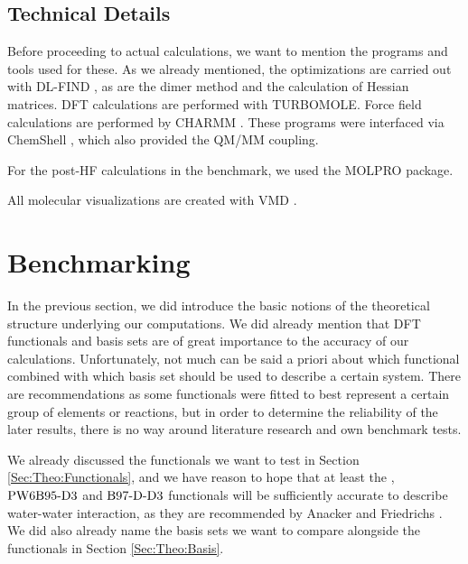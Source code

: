\documentclass[8.5pt,twoside,twocolumn]{article}
\theoremstyle{standard}
\begin{document}
\subsection{Technical Details}

Before proceeding to actual calculations, we want to mention the programs and tools 
used for these. As we already mentioned, the optimizations are carried out with
DL-FIND \cite{Kaestner2009}, as are the dimer method and the calculation of 
Hessian matrices. DFT calculations are performed with TURBOMOLE\cite{TURBOMOLE}.
Force field calculations are performed by CHARMM \cite{CHARMM2009}. These programs were interfaced
via ChemShell \cite{chemshell}, which also provided the QM/MM coupling.

For the post-HF calculations in the benchmark, we used the MOLPRO \cite{MOLPRO_brief}
package.

All molecular visualizations are created with VMD \cite{HUMP96}.



\section{Benchmarking}
\newcommand\htohto{\enmat{\hto-\hto}}
\newcommand\htoh{\enmat{\hto-\te H}}
\label{Sec:Bench}

In the previous section, we did introduce the basic notions of the theoretical structure underlying our
computations. We did already mention that DFT functionals and basis sets are of great importance
to the accuracy of our calculations. Unfortunately, not much can be said a priori about
which functional combined with which basis set should be used to describe a certain system.
There are recommendations as some functionals were fitted to best represent a certain
group of elements or reactions, but in order to determine the reliability of the
later results, there is no way around literature research and own benchmark tests.

We already
discussed the functionals we want to test in Section \ref{Sec:Theo:Functionals}, and we
have reason to hope that at least the \pbez, $\text{PW6B95}\text{-D3}$ and $\text{B97-D}\text{-D3}$ functionals will be sufficiently
accurate to describe water-water interaction, as they are recommended by Anacker and Friedrichs \cite{Anacker2014}.
We did also already name the basis sets we want to compare alongside the functionals in Section \ref{Sec:Theo:Basis}.
\end{document}
